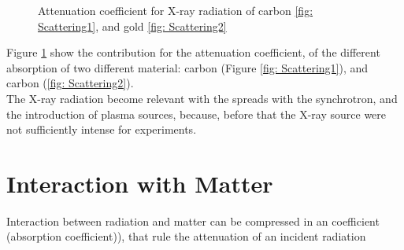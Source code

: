 \begin{figure}[]
%
\centering
%
\quad
%
%
\caption{Attenuation coefficient for X-ray radiation of carbon \ref{fig: Scattering1}, and gold \ref{fig: Scattering2}}
\label{fig :AttenuationCoefficient}
%
\end{figure}
Figure \ref{fig :AttenuationCoefficient} show the contribution for the attenuation coefficient, of the different absorption of two different material: carbon (Figure \ref{fig: Scattering1}), and carbon (\ref{fig: Scattering2}).
\\
The X-ray radiation become relevant with the spreads with the synchrotron, and the introduction of plasma sources, because, before that the X-ray source were not sufficiently intense for experiments.

\section{Interaction with Matter}
\label{sec: Interaction with Matter}
Interaction between radiation and matter can be compressed in an coefficient (absorption coefficient)), that rule the attenuation of an incident radiation

